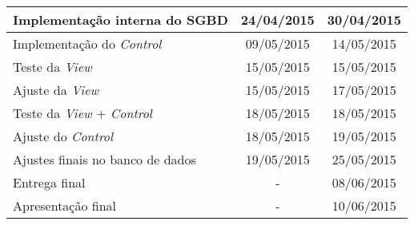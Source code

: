 \documentclass[a4paper,12pt]{article}
\begin{document}
{\begin{longtable}{|l|c|c|}
\hline
\rowcolor{ultramarineblue}
Implementação interna do SGBD             & 24/04/2015                           & 30/04/2015                        \\ \hline


Implementação do \textit{Control}         & 09/05/2015                           & 14/05/2015                        \\ \hline



Teste da \textit{View}                    & 15/05/2015                           & 15/05/2015                        \\ \hline
Ajuste da \textit{View}                   & 15/05/2015                           & 17/05/2015                        \\ \hline
Teste da \textit{View} + \textit{Control} & 18/05/2015                           & 18/05/2015                        \\ \hline
Ajuste do \textit{Control}                & 18/05/2015                           & 19/05/2015                        \\ \hline
Ajustes finais no banco de dados          & 19/05/2015                           & 25/05/2015                        \\ \hline
Entrega final                             & \multicolumn{1}{c|}{-}               & 08/06/2015                        \\ \hline
Apresentação final                        & \multicolumn{1}{c|}{-}               & 10/06/2015                        \\ \hline
\end{longtable}
}
\end{document}
